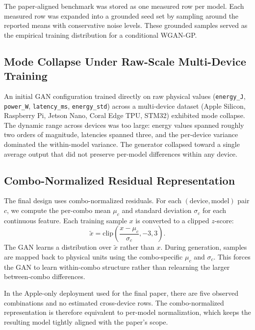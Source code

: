 \documentclass[conference]{IEEEtran}
\begin{document}
The paper-aligned benchmark was stored as one measured row per model. Each
measured row was expanded into a grounded seed set by sampling around the
reported means with conservative noise levels. These grounded samples served
as the empirical training distribution for a conditional WGAN-GP.

\subsection{Mode Collapse Under Raw-Scale Multi-Device Training}
An initial GAN configuration trained directly on raw physical values
(\texttt{energy\_J}, \texttt{power\_W}, \texttt{latency\_ms},
\texttt{energy\_std}) across a multi-device dataset (Apple Silicon, Raspberry
Pi, Jetson Nano, Coral Edge TPU, STM32) exhibited mode collapse. The dynamic
range across devices was too large: energy values spanned roughly two orders
of magnitude, latencies spanned three, and the per-device variance dominated
the within-model variance. The generator collapsed toward a single average
output that did not preserve per-model differences within any device.

\subsection{Combo-Normalized Residual Representation}
The final design uses combo-normalized residuals. For each
$(\text{device}, \text{model})$ pair $c$, we compute the per-combo mean
$\mu_c$ and standard deviation $\sigma_c$ for each continuous feature. Each
training sample $x$ is converted to a clipped $z$-score:
\begin{equation}
\tilde{x} = \mathrm{clip}\!\left(\frac{x - \mu_c}{\sigma_c}, -3, 3\right).
\end{equation}
The GAN learns a distribution over $\tilde{x}$ rather than $x$. During
generation, samples are mapped back to physical units using the combo-specific
$\mu_c$ and $\sigma_c$. This forces the GAN to learn within-combo structure
rather than relearning the larger between-combo differences.

In the Apple-only deployment used for the final paper, there are five observed
combinations and no estimated cross-device rows. The combo-normalized
representation is therefore equivalent to per-model normalization, which keeps
the resulting model tightly aligned with the paper's scope.
\end{document}
